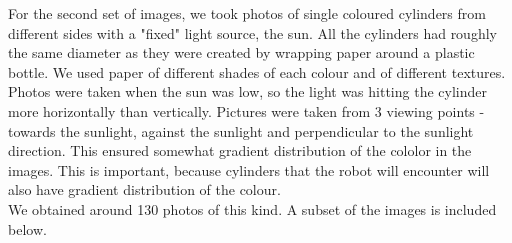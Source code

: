 \documentclass[12pt,a4paper]{article}
\begin{document}
	For the second set of images, we took photos of single coloured cylinders from different sides with a "fixed" light source, the sun. All the cylinders had roughly the same diameter as they were created by wrapping paper around a plastic bottle. We used paper of different shades of each colour and of different textures. \\
	
	Photos were taken when the sun was low, so the light was hitting the cylinder more horizontally than vertically. Pictures were taken from 3 viewing points - towards the sunlight, against the sunlight and perpendicular to the sunlight direction. This ensured somewhat gradient distribution of the cololor in the images. This is important, because cylinders that the robot will encounter will also have gradient distribution of the colour.\\
	
	We obtained around 130 photos of this kind. A subset of the images is included below.
	
\end{document}
